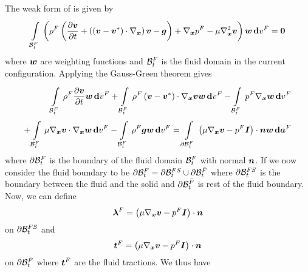 The weak form of  is given by
\begin{equation}
  \gint{\embedmanifold{B}^{F}_{t}}{}{\pbrac{\rho^{F}\pbrac{\delby{\vectr{v}}{t}
        +\pbrac{\dotprod{\pbrac{\vectr{v}-\vectr{v}^{*}}}{\grad_{\vectr{x}}}}\vectr{v}-\vectr{g}}
      +\gradient{\vectr{x}}{p^{F}}-\mu\laplacian{\vectr{x}}{\vectr{v}}}\vectr{w}}{v^{F}}=\vect{0}
\end{equation}
where $\boldsymbol{w}$ are weighting functions and $ \mathcal{B} ^{F}_{t}$ is the fluid 
domain in the current configuration. Applying the Gauss-Green theorem gives
\begin{equation}
  \begin{split}
    \gint{\embedmanifold{B}^{F}_{t}}{}{\rho^{F}\delby{\vectr{v}}{t}\vect{w}}{v^{F}}
    +\gint{\embedmanifold{B}^{F}_{t}}{}{\rho^{F}\dotprod{\pbrac{\vectr{v}-\vect{v}^{*}}}{\gradient{\vectr{x}}{\vectr{v}}}\vect{w}}{v^{F}}
    -\gint{\embedmanifold{B}^{F}_{t}}{}{p^{F}\gradient{\vectr{x}}{\vect{w}}}{v^{F}}\\
    +\gint{\embedmanifold{B}^{F}_{t}}{}{\dotprod{\mu\gradient{\vectr{x}}{\vectr{v}}}{\gradient{\vectr{x}}{\vectr{w}}}}{v^{F}}
    -\gint{\embedmanifold{B}^{F}_{t}}{}{\rho^{F}\vect{g}\vect{w}}{v^{F}}
    =\gint{\boundary{\embedmanifold{B}}^{F}_{t}}{}{\dotprod{\pbrac{\mu\gradient{\vectr{x}}{\vectr{v}}-p^{F}\matr{I}}}{\vectr{n}}\vectr{w}}{\covectr{a}^{F}}
  \end{split}
\end{equation}
where $ \partial{\ensuremath{ \mathcal{B} }} ^{F}_{t}$ is the boundary of the fluid
domain $ \mathcal{B} ^{F}_{t}$ with normal $\boldsymbol{n}$. If we now consider
the fluid boundary to be $ \partial{\ensuremath{ \mathcal{B} }} ^{F}_{t}= \partial{\ensuremath{ \mathcal{B} }} ^{FS}_{t}\cup \partial{\ensuremath{ \mathcal{B} }} ^{\bar{F}}_{t}$
where $ \partial{\ensuremath{ \mathcal{B} }} ^{FS}_{t}$ is the boundary between the fluid and the solid and
$ \partial{\ensuremath{ \mathcal{B} }} ^{\bar{F}}_{t}$ is rest of the fluid boundary. Now, we can define
\begin{equation}
  \vectr{\lambda}^{F}=\dotprod{\pbrac{\mu\gradient{\vectr{x}}{\vectr{v}}-p^{F}\matr{I}}}{\vectr{n}}
\end{equation}
on $ \partial{\ensuremath{ \mathcal{B} }} ^{FS}_{t}$ and
\begin{equation}
  \vectr{t}^{F}=\dotprod{\pbrac{\mu\gradient{\vectr{x}}{\vectr{v}}-p^{F}\matr{I}}}{\vectr{n}}
\end{equation}
on $ \partial{\ensuremath{ \mathcal{B} }} ^{\bar{F}}_{t}$ where $\boldsymbol{t}^{F}$ are the
fluid tractions. We thus have
